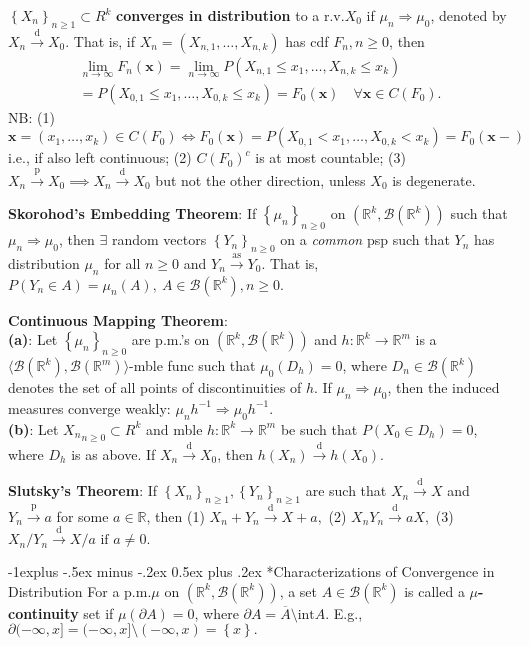 \documentclass[paper=letter,fontsize=2.89mm]{scrartcl}
\makeatletter
\newcommand{\convdist}{\stackrel{\text{d}}{\longrightarrow}}
\newcommand{\convprob}{\stackrel{\text{p}}{\longrightarrow}}
\newcommand{\convas}{\stackrel{\text{as}}{\longrightarrow}}
\newcommand{\Borel}{\mathcal{B}}
\newcommand{\R}{\mathbb{R}}
\newcommand\set[1]{\left\{ #1 \right\}}
\renewcommand{\subsection}{\@startsection{subsection}{2}{0mm}%
                                {-1explus -.5ex minus -.2ex}%
                                {0.5ex plus .2ex}%
                                {\normalfont\normalsize\bfseries}}
\makeatother
\begin{document}
\begin{multicols*}{3}
$\set{X_n}_{n\ge1} \subset R^k$ \textbf{converges in distribution} to a r.v.\@ $X_0$ if $\mu_n \Rightarrow \mu_0$, denoted by $X_n \convdist X_0$. 
That is, if $X_n = (X_{n,1}, \dots, X_{n,k})$ has cdf $F_n, n \ge 0$, then
\begin{align*}
\lim_{n\to\infty}F_n(\mathbf{x}) 
= \lim_{n\to\infty} P(X_{n,1} \le x_1, \dots, X_{n,k} \le x_k) \\
= P(X_{0,1} \le x_1, \dots, X_{0,k} \le x_k) 
= F_0(\mathbf{x}) \quad \forall \mathbf{x} \in C(F_0).
\end{align*}
NB:
(1) $\mathbf{x} = (x_1, \dots, x_k) \in C(F_0) \iff F_0(\mathbf{x}) = P(X_{0,1} < x_1, \dots, X_{0,k} < x_k) = F_0(\mathbf{x}-)$
i.e., if also left continuous; (2)  $C(F_0)^c$ is at most countable; (3)  $X_n \convprob X_0 \implies X_n \convdist X_0$ but not the other direction, unless $X_0$ is degenerate. \\ \medskip

\textbf{Skorohod's Embedding Theorem}: If $\set{\mu_n}_{ n\ge0}$ on $(\R^k, \Borel(\R^k))$ such that $\mu_n \Rightarrow \mu_0$, then $\exists$ random vectors $\set{Y_n}_{n\ge0}$ on a \emph{common} psp such that $Y_n$ has distribution $\mu_n$ for all $n \ge 0$ and $Y_n \convas Y_0$. That is, $P(Y_n \in A) = \mu_n(A), ~A \in \Borel(\R^k), n \ge 0$. \\ \medskip

\textbf{Continuous Mapping Theorem}: \\
\textbf{(a)}: Let $\set{\mu_n}_{n \ge0}$ are p.m.'s on $(\R^k, \Borel(\R^k))$  and $h: \R^k \to \R^m$ is a $\langle \Borel(\R^k), \Borel(\R^m) \rangle$-mble func such that $\mu_0(D_h)  = 0$, where $D_n \in \Borel(\R^k)$ denotes the set of all points of discontinuities of $h$. If $\mu_n \Rightarrow \mu_0$, then the induced measures converge weakly: $\mu_n h^{-1} \Rightarrow \mu_0 h^{-1}.$ \\
\textbf{(b)}: Let ${X_n}_{n \ge 0} \subset R^k$ and mble $h: \R^k \to \R^m$ be such that $P(X_0 \in D_h) = 0$, where $D_h$ is as above. If $X_n \convdist X_0$, then
$h(X_n) \convdist h(X_0).$ \\ \medskip

\textbf{Slutsky's Theorem}: If $\set{X_n}_{n\ge1}, \set{Y_n}_{n \ge 1}$ are such that $X_n \convdist X$ and $Y_n \convprob a$ for some $a \in \R$, then
(1) $X_n + Y_n \convdist X + a, $ (2) $ X_nY_n \convdist aX, $ (3) $ X_n/Y_n \convdist X/a \text{ if } a \ne 0.$ \\ \medskip

\subsection*{Characterizations of Convergence in Distribution}
For a p.m.\@ $\mu$ on $(\R^k, \Borel(\R^k))$, a set $A \in \Borel(\R^k)$ is called a \textbf{$\mu$-continuity} set if $\mu(\partial A) = 0$, where $\partial A = \overline{A} \setminus \text{int}A$. E.g., $\partial (-\infty, x] = (-\infty, x] \setminus (-\infty, x) = \set{x}.$ \\ \medskip


\end{multicols*}
\end{document}
